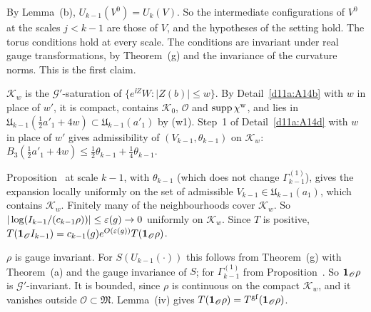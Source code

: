\begin{detail}\label{d11a:A14f}
\begin{step}
By Lemma~(b), $U_{k-1}(V^0)=U_k(V)$. So the intermediate configurations of $V^0$ at the scales $j<k-1$ are those of $V$, and the hypotheses of the setting hold. The torus conditions hold at every scale. The conditions are invariant under real gauge transformations, by Theorem~(g) and the invariance of the curvature norms. This is the first claim.
\end{step}
\begin{step}
$\mathcal K_w$ is the $\mathcal G'$-saturation of $\{e^{\ii Z}W:|Z(b)|\le w\}$. By Detail~\ref{d11a:A14b} with $w$ in place of $w'$, it is compact, contains $\mathcal K_0$, $\mathscr O$ and $\operatorname{supp}\chi^{\rm w}$, and lies in $\mathfrak U_{k-1}(\frac12a'_1+4w)\subset\mathfrak U_{k-1}(a'_1)$ by (w1). Step~1 of Detail~\ref{d11a:A14d} with $w$ in place of $w'$ gives admissibility of $(V_{k-1},\theta_{k-1})$ on $\mathcal K_w$: $B_3(\frac12a'_1+4w)\le\frac12\theta_{k-1}+\frac14\theta_{k-1}$.
\end{step}
\begin{step}
Proposition~ at scale $k-1$, with $\theta_{k-1}$ (which does not change $\Gamma^{(1)}_{k-1}$), gives the expansion locally uniformly on the set of admissible $V_{k-1}\in\mathfrak U_{k-1}(a_1)$, which contains $\mathcal K_w$. Finitely many of the neighbourhoods cover $\mathcal K_w$. So $|\log(I_{k-1}/(c_{k-1}\rho))|\le\varepsilon(g)\to0$ uniformly on $\mathcal K_w$. Since $T$ is positive, $T(\mathbf 1_{\mathscr O}I_{k-1})=c_{k-1}(g)e^{O(\varepsilon(g))}T(\mathbf 1_{\mathscr O}\rho)$.
\end{step}
\begin{step}
$\rho$ is gauge invariant. For $S(U_{k-1}(\cdot))$ this follows from Theorem~(g) with Theorem~(a) and the gauge invariance of $S$; for $\Gamma^{(1)}_{k-1}$ from Proposition~. So $\mathbf 1_{\mathscr O}\rho$ is $\mathcal G'$-invariant. It is bounded, since $\rho$ is continuous on the compact $\mathcal K_w$, and it vanishes outside $\mathscr O\subset\mathfrak M$. Lemma~(iv) gives $T(\mathbf 1_{\mathscr O}\rho)=T^{\rm gf}(\mathbf 1_{\mathscr O}\rho)$.
\end{step}
\end{detail}

